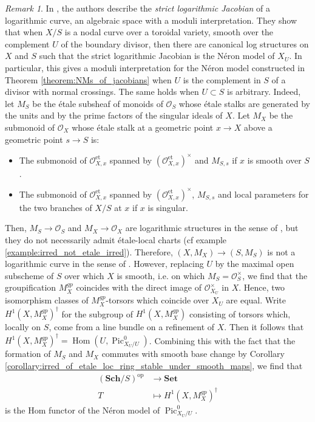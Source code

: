 \documentclass[a4paper,12pt]{amsart} %
\numberwithin{equation}{subsection}
\newcommand{\Sch}[1]{\cat{Sch}/#1}
\newcommand{\on}[1]{\operatorname{#1}}
\newcommand{\bd}[1]{{\mathbf{#1}}}
\newcommand{\cat}[1]{\bd{#1}}
\newcommand{\Hom}{\operatorname{Hom}}
\theoremstyle{definition}
\theoremstyle{plain}%
\theoremstyle{remark}
\newtheorem{remark}[definition]{Remark}
\renewcommand{\O}{\mathcal{O}}
\begin{document}
\begin{remark}\label{remark:strict_log_jac_vs_pic_aggregate}
In \cite{HMOPModelsJacobians}, the authors describe the \emph{strict logarithmic Jacobian} of a logarithmic curve, an algebraic space with a moduli interpretation. They show that when $X/S$ is a nodal curve over a toroidal variety, smooth over the complement $U$ of the boundary divisor, then there are canonical log structures on $X$ and $S$ such that the strict logarithmic Jacobian is the Néron model of $X_U$. In particular, this gives a moduli interpretation for the Néron model constructed in Theorem \ref{theorem:NMs_of_jacobians} when $U$ is the complement in $S$ of a divisor with normal crossings. The same holds when $U\subset S$ is arbitrary. Indeed, let $M_S$ be the étale subsheaf of monoids of $\O_S$ whose étale stalks are generated by the units and by the prime factors of the singular ideals of $X$. Let $M_X$ be the submonoid of $\O_X$ whose étale stalk at a geometric point $x\to X$ above a geometric point $s\to S$ is:
\begin{itemize}
\item The submonoid of $\O_{X,x}^{\on{et}}$ spanned by $(\O_{X,x}^{\on{et}})^\times$ and $M_{S,s}$ if $x$ is smooth over $S$.
\item The submonoid of $\O_{X,x}^{\on{et}}$ spanned by $(\O_{X,x}^{\on{et}})^\times$, $M_{S,s}$ and local parameters for the two branches of $X/S$ at $x$ if $x$ is singular.
\end{itemize}
Then, $M_S\to \O_S$ and $M_X\to \O_X$ are logarithmic structures in the sense of \cite{Kato}, but they do not necessarily admit étale-local charts (cf example \ref{example:irred_not_etale_irred}). Therefore, $(X,M_X)\to (S,M_S)$ is not a logarithmic curve in the sense of \cite{HMOPModelsJacobians}. However, replacing $U$ by the maximal open subscheme of $S$ over which $X$ is smooth, i.e. on which $M_S=\O_S^\times$, we find that the groupification $M_X^{gp}$ coincides with the direct image of $\O_{X_U}^\times$ in $X$. Hence, two isomorphism classes of $M_X^{gp}$-torsors which coincide over $X_U$ are equal. Write $H^1(X,M_X^{gp})^\dagger$ for the subgroup of $H^1(X,M_X^{gp})$ consisting of torsors which, locally on $S$, come from a line bundle on a refinement of $X$. Then it follows that $H^1(X,M_X^{gp})^\dagger=\Hom(U,\operatorname{Pic}^0_{X_U/U})$. Combining this with the fact that the formation of $M_S$ and $M_X$ commutes with smooth base change by Corollary \ref{corollary:irred_of_etale_loc_ring_stable_under_smooth_maps}, we find that
\begin{align*}
(\Sch{S})^{\on{op}} & \to \cat{Set} \\
T & \mapsto H^1(X,M_X^{gp})^\dagger
\end{align*}
is the Hom functor of the Néron model of $\operatorname{Pic}^0_{X_U/U}$.
\end{remark}
\end{document}
